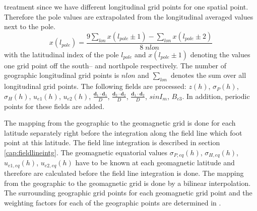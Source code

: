  treatment
since we have different longitudinal grid points for one spatial point. 
Therefore the pole values are
extrapolated from the longitudinal averaged values next to the pole.
%
\begin{equation}
   x(l_{pole}) = \frac{9 \sum_{lon} x(l_{pole} \pm 1)-\sum_{lon} x(l_{pole} \pm 2)}
      {8 \; nlon}
\end{equation}
%
with the latitudinal index of the pole $l_{pole}$ and $x(l_{pole} \pm 1)$ denoting
the values one grid point off the south-- and northpole respectively. The number of
geographic longitudinal grid points is $nlon$ and $\sum_{lon}$ denotes the sum over all
longitudinal grid points. The following
fields are processed: $z(h)$, $\sigma_P(h)$, ${\sigma}_{H}(h)$, $u_{e1}(h)$, 
$u_{e2}(h)$,
$\frac{\mathbf{d}_1 \cdot \mathbf{d}_1}{D}$, $\frac{\mathbf{d}_2 \cdot \mathbf{d}_2}{D}$, 
$\frac{\mathbf{d}_1 \cdot \mathbf{d}_2}{D}$, $sin I_m$, $B_{e3} $. In addition, periodic
points for these fields are added.

%
The mapping from the geographic to the geomagnetic grid is done for each latitude
separately right before the integration along the field line which foot point at
this latitude. 
The field line integration is described in section 
\ref{cap:fieldlineintg}. The geomagnetic equatorial values 
$\sigma_{P, eq}(h)$, ${\sigma}_{H, eq}(h)$, $u_{e1, eq}(h)$, $u_{e2, eq}(h) $ 
have to be known at each geomagnetic
latitude and therefore are calculated before the field line integration 
is done. The mapping from the geographic to the geomagnetic grid
is done by a  bilinear interpolation. The surrounding geographic grid points
for each geomagnetic grid point and the weighting factors for each of the
geographic points are determined in .


